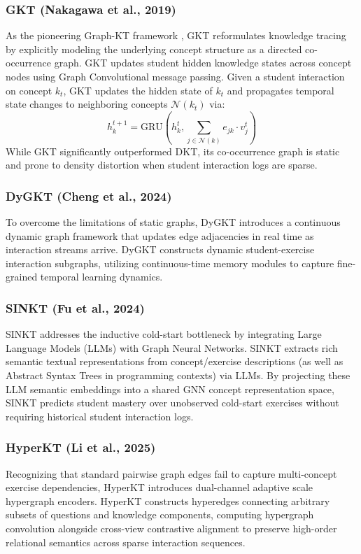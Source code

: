 \documentclass[10pt,journal,compsoc]{IEEEtran}
\begin{document}
\subsubsection{GKT (Nakagawa et al., 2019)}
As the pioneering Graph-KT framework \cite{KT004_GKT_2019}, GKT reformulates knowledge tracing by explicitly modeling the underlying concept structure as a directed co-occurrence graph. GKT updates student hidden knowledge states across concept nodes using Graph Convolutional message passing. Given a student interaction on concept $k_t$, GKT updates the hidden state of $k_t$ and propagates temporal state changes to neighboring concepts $\mathcal{N}(k_t)$ via:
\begin{equation}
h_{k}^{t+1} = \text{GRU}\left( h_{k}^{t}, \sum_{j \in \mathcal{N}(k)} e_{jk} \cdot v_{j}^t \right)
\end{equation}
While GKT significantly outperformed DKT, its co-occurrence graph is static and prone to density distortion when student interaction logs are sparse.

\subsubsection{DyGKT (Cheng et al., 2024)}
To overcome the limitations of static graphs, DyGKT \cite{KT038_DyGKT_2024} introduces a continuous dynamic graph framework that updates edge adjacencies in real time as interaction streams arrive. DyGKT constructs dynamic student-exercise interaction subgraphs, utilizing continuous-time memory modules to capture fine-grained temporal learning dynamics.

\subsubsection{SINKT (Fu et al., 2024)}
SINKT \cite{KT044_SINKT_2024} addresses the inductive cold-start bottleneck by integrating Large Language Models (LLMs) with Graph Neural Networks. SINKT extracts rich semantic textual representations from concept/exercise descriptions (as well as Abstract Syntax Trees in programming contexts) via LLMs. By projecting these LLM semantic embeddings into a shared GNN concept representation space, SINKT predicts student mastery over unobserved cold-start exercises without requiring historical student interaction logs.

\subsubsection{HyperKT (Li et al., 2025)}
Recognizing that standard pairwise graph edges fail to capture multi-concept exercise dependencies, HyperKT \cite{KT066_HyperKT_2025} introduces dual-channel adaptive scale hypergraph encoders. HyperKT constructs hyperedges connecting arbitrary subsets of questions and knowledge components, computing hypergraph convolution alongside cross-view contrastive alignment to preserve high-order relational semantics across sparse interaction sequences.
\end{document}
